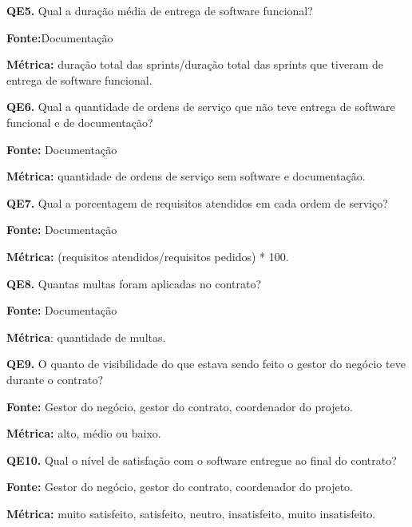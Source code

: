  \vspace{\onelineskip} 

\textbf{QE5.} Qual a duração média de entrega de software funcional?

\textbf{Fonte:}Documentação

\textbf{Métrica:} duração total das sprints/duração total das sprints que tiveram de entrega de software funcional.

 \vspace{\onelineskip} 

\textbf{QE6.} Qual a quantidade de ordens de serviço que não teve entrega de software funcional e de documentação?

\textbf{Fonte:} Documentação

\textbf{Métrica:} quantidade de ordens de serviço sem software e documentação.

 \vspace{\onelineskip} 
 
\textbf{QE7.} Qual a porcentagem de requisitos atendidos em cada ordem de serviço?

\textbf{Fonte:} Documentação

\textbf{Métrica:} (requisitos atendidos/requisitos pedidos) * 100.
 
 \vspace{\onelineskip} 

\textbf{QE8.} Quantas multas foram aplicadas no contrato?

\textbf{Fonte:} Documentação

\textbf{Métrica}: quantidade de multas.

 \vspace{\onelineskip}  

\textbf{QE9.} O quanto de visibilidade do que estava sendo feito o gestor do negócio teve durante o contrato?

\textbf{Fonte:} Gestor do negócio, gestor do contrato, coordenador do projeto.

\textbf{Métrica:} alto, médio ou baixo. 
 
 \vspace{\onelineskip} 

\textbf{QE10.} Qual o nível de satisfação com o software entregue ao final do contrato?

\textbf{Fonte:} Gestor do negócio, gestor do contrato, coordenador do projeto.

\textbf{Métrica:} muito satisfeito, satisfeito, neutro, insatisfeito, muito insatisfeito.
 

